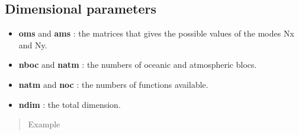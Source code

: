 \documentclass[letterpaper,10pt,english]{sphinxmanual}
\begin{document}
\subsection{Dimensional parameters}
\label{rstfiles/params_maooam:dimensional-parameters}\begin{itemize}
\item {} 
\textbf{oms} and \textbf{ams} : the matrices that gives the possible values of the modes Nx and Ny.

\item {} 
\textbf{nboc} and \textbf{natm} : the numbers of oceanic and atmospheric blocs.

\item {} 
\textbf{natm} and \textbf{noc} : the numbers of functions available.

\item {} 
\textbf{ndim} : the total dimension.

\end{itemize}
\begin{quote}\begin{description}
\item[{Example}] \leavevmode
\end{description}\end{quote}
\end{document}
